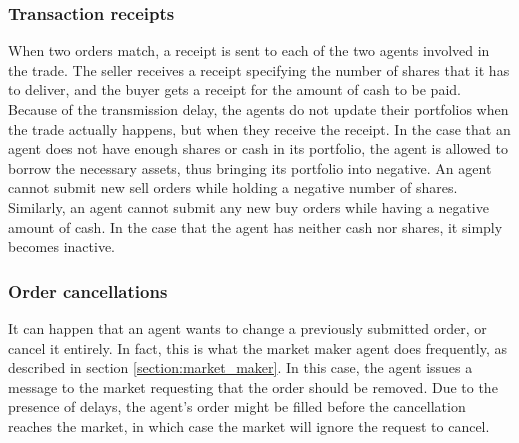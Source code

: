 \subsubsection{Transaction receipts}
When two orders match, a receipt is sent to each of the two agents involved in the trade. The seller receives a receipt specifying the number of shares that it has to deliver, and the buyer gets a receipt for the amount of cash to be paid. Because of the transmission delay, the agents do not update their portfolios when the trade actually happens, but when they receive the receipt. In the case that an agent does not have enough shares or cash in its portfolio, the agent is allowed to borrow the necessary assets, thus bringing its portfolio into negative. An agent cannot submit new sell orders while holding a negative number of shares. Similarly, an agent cannot submit any new buy orders while having a negative amount of cash. In the case that the agent has neither cash nor shares, it simply becomes inactive.

\subsubsection{Order cancellations}
It can happen that an agent wants to change a previously submitted order, or cancel it entirely. In fact, this is what the market maker agent does frequently, as described in section \ref{section:market_maker}. In this case, the agent issues a message to the market requesting that the order should be removed. Due to the presence of delays, the agent's order might be filled before the cancellation reaches the market, in which case the market will ignore the request to cancel.

